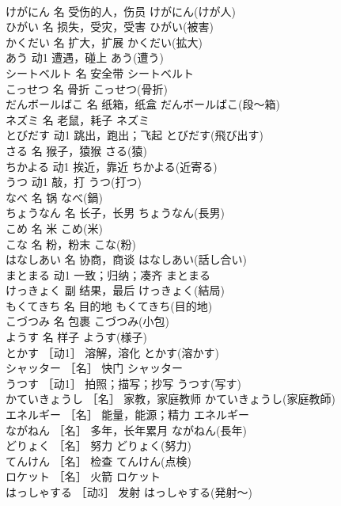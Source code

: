 \documentclass[8pt]{extreport}
\begin{document}
\begin{CJK}{UTF8}{min}
\\	けがにん	名	受伤的人，伤员	けがにん(けが人)	
\\	ひがい	名	损失，受灾，受害	ひがい(被害)	
\\	かくだい	名	扩大，扩展	かくだい(拡大)	
\\	あう	动1	遭遇，碰上	あう(遭う)	
\\	シートベルト	名	安全带	シートベルト	
\\	こっせつ	名	骨折	こっせつ(骨折)	
\\	だんボールばこ	名	纸箱，纸盒	だんボールばこ(段～箱)	
\\	ネズミ	名	老鼠，耗子	ネズミ	
\\	とびだす	动1	跳出，跑出；飞起	とびだす(飛び出す)	
\\	さる	名	猴子，猿猴	さる(猿)	
\\	ちかよる	动1	挨近，靠近	ちかよる(近寄る)	
\\	うつ	动1	敲，打	うつ(打つ)	
\\	なべ	名	锅	なべ(鍋)	
\\	ちょうなん	名	长子，长男	ちょうなん(長男)	
\\	こめ	名	米	こめ(米)	
\\	こな	名	粉，粉末	こな(粉)	
\\	はなしあい	名	协商，商谈	はなしあい(話し合い)	
\\	まとまる	动1	一致；归纳；凑齐	まとまる	
\\	けっきょく	副	结果，最后	けっきょく(結局)	
\\	もくてきち	名	目的地	もくてきち(目的地)	
\\	こづつみ	名	包裹	こづつみ(小包)	
\\	ようす	名	样子	ようす(様子)	
\\	とかす	［动1］	溶解，溶化	とかす(溶かす)	
\\	シャッター	［名］	快门	シャッター	
\\	うつす	［动1］	拍照；描写；抄写	うつす(写す)	
\\	かていきょうし	［名］	家教，家庭教师	かていきょうし(家庭教師)	
\\	エネルギー	［名］	能量，能源；精力	エネルギー	
\\	ながねん	［名］	多年，长年累月	ながねん(長年)	
\\	どりょく	［名］	努力	どりょく(努力)	
\\	てんけん	［名］	检查	てんけん(点検)	
\\	ロケット	［名］	火箭	ロケット	
\\	はっしゃする	［动3］	发射	はっしゃする(発射～)	

\end{CJK}
\end{document}

